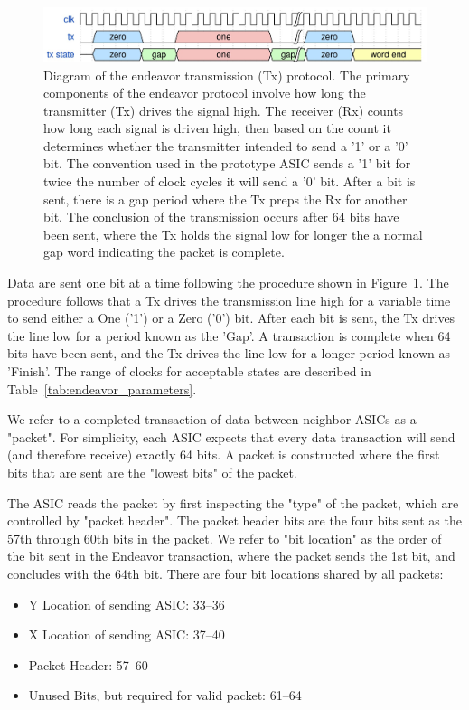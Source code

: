 \begin{figure}[]
\centering
\includegraphics[width=\textwidth]{images/endeavor_protocol.jpg}
\caption{Diagram of the endeavor transmission (Tx) protocol.
The primary components of the endeavor protocol involve how long the transmitter (Tx) drives the signal high.
The receiver (Rx) counts how long each signal is driven high, then based on the count it determines whether the transmitter intended to send a '1' or a '0' bit.
The convention used in the prototype ASIC sends a '1' bit for twice the number of clock cycles it will send a '0' bit.
After a bit is sent, there is a gap period where the Tx preps the Rx for another bit.
The conclusion of the transmission occurs after 64 bits have been sent, where the Tx holds the signal low for longer the a normal gap word indicating the packet is complete.
}
\label{fig:endeavor}
\end{figure}

Data are sent one bit at a time following the procedure shown in Figure~\ref{fig:endeavor}. 
The procedure follows that a Tx drives the transmission line high for a variable time to send either a One ('1') or a Zero ('0') bit.
After each bit is sent, the Tx drives the line low for a period known as the 'Gap'.
A transaction is complete when 64 bits have been sent, and the Tx drives the line low for a longer period known as 'Finish'.
The range of clocks for acceptable states are described in Table~\ref{tab:endeavor_parameters}.

We refer to a completed transaction of data between neighbor ASICs as a "packet".
For simplicity, each ASIC expects that every data transaction will send (and therefore receive) exactly 64 bits.
A packet is constructed where the first bits that are sent are the "lowest bits" of the packet.

The ASIC reads the packet by first inspecting the "type" of the packet, which are controlled by "packet header".
The packet header bits are the four bits sent as the 57th through 60th bits in the packet.
We refer to "bit location" as the order of the bit sent in the Endeavor transaction, where the packet sends the 1st bit, and concludes with the 64th bit.
There are four bit locations shared by all packets:

\begin{itemize}
    \item Y Location of sending ASIC: 33--36
    \item X Location of sending ASIC: 37--40
    \item Packet Header: 57--60
    \item Unused Bits, but required for valid packet: 61--64
\label{bit_reservation}
\end{itemize}

